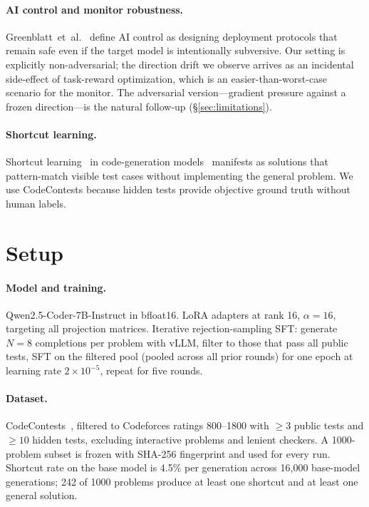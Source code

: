 \documentclass[11pt]{article}
\begin{document}
\paragraph{AI control and monitor robustness.}
Greenblatt~et~al.~\citep{greenblatt2023control} define AI control as
designing deployment protocols that remain safe even if the target
model is intentionally subversive. Our setting is explicitly
non-adversarial; the direction drift we observe arrives as an
incidental side-effect of task-reward optimization, which is an
easier-than-worst-case scenario for the monitor. The adversarial
version---gradient pressure against a frozen direction---is the natural
follow-up (\S\ref{sec:limitations}).

\paragraph{Shortcut learning.} Shortcut
learning~\citep{geirhos2020shortcut} in code-generation
models~\citep{hendrycks2021apps} manifests as solutions that pattern-match
visible test cases without implementing the general problem. We use
CodeContests because hidden tests provide objective ground truth
without human labels.

\section{Setup}
\label{sec:setup}

\paragraph{Model and training.} Qwen2.5-Coder-7B-Instruct in bfloat16.
LoRA adapters at rank 16, $\alpha{=}16$, targeting all projection
matrices. Iterative rejection-sampling SFT: generate $N{=}8$ completions
per problem with vLLM, filter to those that pass all public tests, SFT
on the filtered pool (pooled across all prior rounds) for one epoch at
learning rate $2\times 10^{-5}$, repeat for five rounds.

\paragraph{Dataset.} CodeContests~\citep{li2022codecontests}, filtered to
Codeforces ratings 800--1800 with $\geq 3$ public tests and $\geq 10$
hidden tests, excluding interactive problems and lenient checkers. A
1000-problem subset is frozen with SHA-256 fingerprint and used for
every run. Shortcut rate on the base model is 4.5\% per generation
across 16{,}000 base-model generations; 242 of 1000 problems produce at
least one shortcut and at least one general solution.
\end{document}

